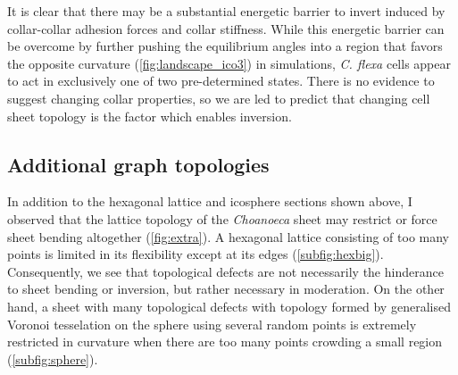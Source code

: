 It is clear that there may be a substantial energetic barrier to invert induced by collar-collar adhesion forces and collar stiffness. 
While this energetic barrier can be overcome by further pushing the equilibrium angles into a region that favors the opposite curvature (\cref{fig:landscape_ico3}) in simulations, \textit{C. flexa} cells appear to act in exclusively one of two pre-determined states.
There is no evidence to suggest changing collar properties, so we are led to predict that changing cell sheet topology is the factor which enables inversion.

\subsection{Additional graph topologies}

In addition to the hexagonal lattice and icosphere sections shown above, I observed that the lattice topology of the \textit{Choanoeca} sheet may restrict or force sheet bending altogether (\cref{fig:extra}).
A hexagonal lattice consisting of too many points is limited in its flexibility except at its edges (\cref{subfig:hexbig}). 
Consequently, we see that topological defects are not necessarily the hinderance to sheet bending or inversion, but rather necessary in moderation.
On the other hand, a sheet with many topological defects with topology formed by generalised Voronoi tesselation on the sphere using several random points is extremely restricted in curvature when there are too many points crowding a small region (\cref{subfig:sphere}).

